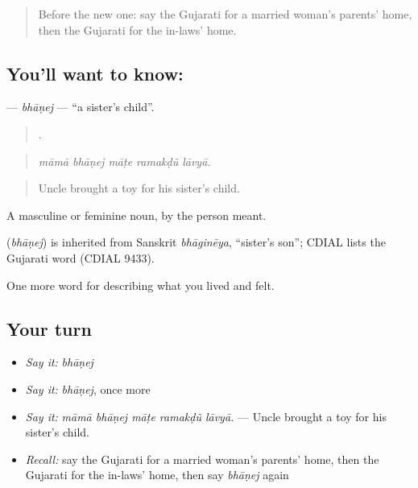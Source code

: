 \begin{quote}
Before the new one: say the Gujarati for a married woman's parents' home, then the Gujarati for the in-laws' home.
\end{quote}

\subsection*{You'll want to know: }
\textbf{} — \emph{bhāṇej} — \textquotedblleft{}a sister's child\textquotedblright{}.

\begin{quote}
    .
\end{quote}

\begin{quote}
\emph{māmā bhāṇej māṭe ramakḍũ lāvyā.}
\end{quote}

\begin{quote}
Uncle brought a toy for his sister's child.
\end{quote}

A masculine or feminine noun, by the person meant.

\begin{cousinweb}
\textbf{} (\emph{bhāṇej}) is inherited from Sanskrit \emph{bhāginēya}, \textquotedblleft{}sister's son\textquotedblright{}; CDIAL lists the Gujarati word (CDIAL 9433).
\end{cousinweb}

\begin{grammarlens}[title={What you've built}]
One more word for describing what you lived and felt.
\end{grammarlens}

\subsection*{Your turn}
\begin{itemize}
\raggedright
  \item \emph{Say it:} \emph{bhāṇej}
  \item \emph{Say it:} \emph{bhāṇej}, once more
  \item \emph{Say it:} \emph{māmā bhāṇej māṭe ramakḍũ lāvyā.} — Uncle brought a toy for his sister's child.
  \item \emph{Recall:} say the Gujarati for a married woman's parents' home, then the Gujarati for the in-laws' home, then say \emph{bhāṇej} again
\end{itemize}

